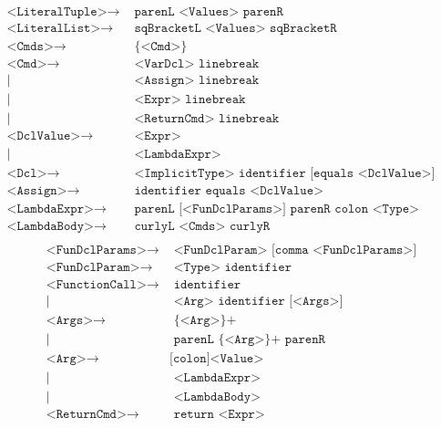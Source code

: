 \begin{align*}
	\texttt{<LiteralTuple>}\to & \texttt{ parenL <Values> parenR}\\
	\texttt{<LiteralList>}\to & \texttt{ sqBracketL <Values> sqBracketR}\\
	\texttt{<Cmds>}\to & \texttt{ \{<Cmd>\}}\\
	\texttt{<Cmd>}\to & \texttt{ <VarDcl> linebreak}\\
	| & \texttt{ <Assign> linebreak}\\
	| & \texttt{ <Expr> linebreak}\\
	| & \texttt{ <ReturnCmd> linebreak}\\
	\texttt{<DclValue>}\to & \texttt{ <Expr>}\\
	| & \texttt{ <LambdaExpr>}\\
	\texttt{<Dcl>}\to & \texttt{ <ImplicitType> identifier [equals <DclValue>]}\\
	\texttt{<Assign>}\to & \texttt{ identifier equals <DclValue>}\\
	\texttt{<LambdaExpr>}\to & \texttt{ parenL [<FunDclParams>] parenR colon <Type> <LambdaBody>}\\
	\texttt{<LambdaBody>}\to & \texttt{ curlyL <Cmds> curlyR}\\
\end{align*} %
\begin{align*}
	\texttt{<FunDclParams>}\to & \texttt{ <FunDclParam> [comma <FunDclParams>]}\\
	\texttt{<FunDclParam>}\to & \texttt{ <Type> identifier}\\
	\texttt{<FunctionCall>}\to & \texttt{ identifier}\\
	| & \texttt{ <Arg> identifier [<Args>]}\\
	\texttt{<Args>}\to & \texttt{ \{<Arg>\}+}\\
	| & \texttt{ parenL \{<Arg>\}+ parenR}\\
	\texttt{<Arg>}\to & \texttt{[colon]<Value>}\\
	| & \texttt{ <LambdaExpr>}\\
	| & \texttt{ <LambdaBody>}\\
	\texttt{<ReturnCmd>}\to & \texttt{ return <Expr>}
\end{align*}
\newpage
